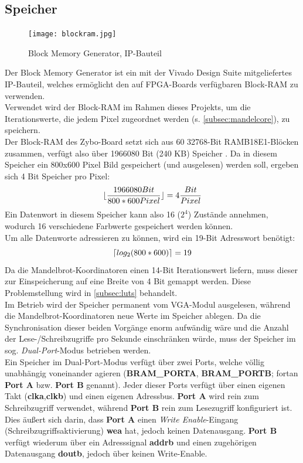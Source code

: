 \documentclass[a4paper,12pt,onesided]{report}
\begin{document}
\subsection{Speicher}
\label{subsec:ram}
\begin{figure}[H]
	\centering
	\texttt{[image: blockram.jpg]}
	\caption{Block Memory Generator, IP-Bauteil}
	\label{fig:schem_bram}
\end{figure}
Der Block Memory Generator ist ein mit der Vivado Design Suite mitgeliefertes IP-Bauteil, welches ermöglicht den auf FPGA-Boards verfügbaren Block-RAM zu verwenden.\\
Verwendet wird der Block-RAM im Rahmen dieses Projekts, um die Iterationswerte, die jedem Pixel zugeordnet werden (s. \autoref{subsec:mandelcore}), zu speichern.\\
Der Block-RAM des Zybo-Board setzt sich aus 60 32768-Bit RAMB18E1-Blöcken zusammen, verfügt also über 1966080 Bit (240 KB) Speicher \cite[S. 14]{bram} \cite{zyboref}.
Da in diesem Speicher ein 800x600 Pixel Bild gespeichert (und ausgelesen) werden soll, ergeben sich 4 Bit Speicher pro Pixel:
\[\lfloor\frac{1966080 Bit}{800*600 Pixel}\rfloor=4 \frac{Bit}{Pixel} \]
Ein Datenwort in diesem Speicher kann also 16 ($2^4$) Zustände annehmen, wodurch 16 verschiedene Farbwerte gespeichert werden können.\\
Um alle Datenworte adressieren zu können, wird ein 19-Bit Adresswort benötigt:
\[\lceil log_2{(800*600)}\rceil=19\]
Da die Mandelbrot-Koordinatoren einen 14-Bit Iterationswert liefern, muss dieser zur Einspeicherung auf eine Breite von 4 Bit gemappt werden. Diese Problemstellung wird in \autoref{subsec:luts} behandelt.\\
Im Betrieb wird der Speicher permanent vom VGA-Modul ausgelesen, während die Mandelbrot-Koordinatoren neue Werte im Speicher ablegen. 
Da die Synchronisation dieser beiden Vorgänge enorm aufwändig wäre und die Anzahl der Lese-/Schreibzugriffe pro Sekunde einschränken würde, muss der Speicher im sog. \textit{Dual-Port}-Modus betrieben werden.\\
Ein Speicher im Dual-Port-Modus verfügt über zwei Ports, welche völlig unabhängig voneinander agieren (\textbf{BRAM\_PORTA}, \textbf{BRAM\_PORTB}; fortan \textbf{Port A} bzw. \textbf{Port B} genannt). 
Jeder dieser Ports verfügt über einen eigenen Takt (\textbf{clka},\textbf{clkb}) und einen eigenen Adressbus.
\textbf{Port A} wird rein zum Schreibzugriff verwendet, während \textbf{Port B} rein zum Lesezugriff konfiguriert ist. Dies äußert sich darin, dass \textbf{Port A} einen \textit{Write Enable}-Eingang (Schreibzugriffsaktivierung) \textbf{wea} hat, jedoch keinen Datenausgang. 
\textbf{Port B} verfügt wiederum über ein Adresssignal \textbf{addrb} und einen zugehörigen Datenausgang \textbf{doutb}, jedoch über keinen Write-Enable.
\end{document}
